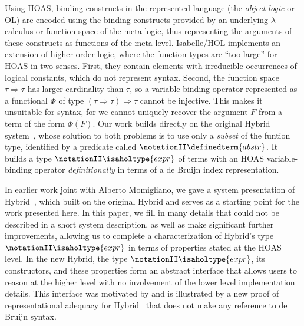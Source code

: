 \documentclass[copyright,creativecommons]{eptcs}
\begin{document}
Using HOAS, binding constructs in the represented language (the
\emph{object logic} or OL) are encoded using the binding constructs
provided by an underlying $\lambda$-calculus or function space of the
meta-logic, thus representing the arguments of these constructs as
functions of the meta-level.  Isabelle/HOL implements an extension of
higher-order logic, where the function types are ``too large'' for
HOAS in two senses.  First, they contain elements with irreducible
occurrences of logical constants, which do not represent syntax.
Second, the function space $\tau \Rightarrow \tau$ has larger
cardinality than $\tau$, so a variable-binding operator represented as
a functional $\Phi$ of type $(\tau \Rightarrow \tau)\Rightarrow \tau$
cannot be injective.  This makes it unsuitable for syntax, for we
cannot uniquely recover the argument $F$ from a term of the form
$\Phi(F)$.  Our work builds directly on the original Hybrid
system~\cite{ambler/crole/momigliano:2002}, whose solution to both
problems is to use only a \emph{subset} of the funtion type,
identified by a predicate called \(\notationII \definedterm{abstr}\).  It builds a type
\(\notationII \isaholtype{expr}\) of terms with an HOAS variable-binding operator
\emph{definitionally} in terms of a de Bruijn index representation.

In earlier work joint with Alberto Momigliano, we gave a system
presentation of Hybrid~\cite{momigliano/martin/felty:2008}, which
built on the original Hybrid and serves as a starting point for the
work presented here.  In this paper, we fill in many details that
could not be described in a short system description, as well as make
significant further improvements, allowing us to complete a
characterization of Hybrid's type \(\notationII \isaholtype{expr}\) in terms of properties
stated at the HOAS level.  In the new Hybrid, the type \(\notationII \isaholtype{expr}\), its
constructors, and these properties form an abstract interface that
allows users to reason at the higher level with no involvement of the
lower level implementation details.  This interface was motivated by
and is illustrated by a new proof of representational adequacy for
Hybrid~\cite[Sect.~3.4]{martin:2010a} that does not make any reference
to de Bruijn syntax.
\end{document}
